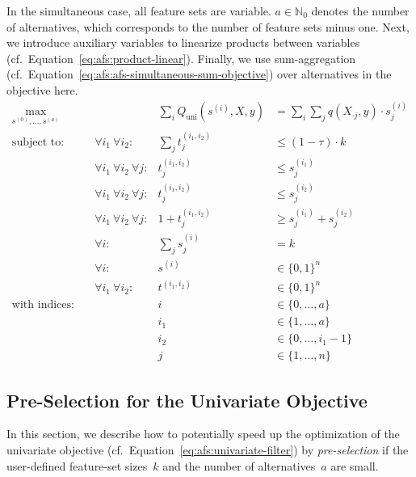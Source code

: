 \documentclass{article}
\theoremstyle{definition}
\begin{document}
In the simultaneous case, all feature sets are variable.
$a \in \mathbb{N}_0$ denotes the number of alternatives, which corresponds to the number of feature sets minus one.
Next, we introduce auxiliary variables to linearize products between variables (cf.~Equation~\ref{eq:afs:product-linear}).
Finally, we use sum-aggregation (cf.~Equation~\ref{eq:afs:afs-simultaneous-sum-objective}) over alternatives in the objective here.
%
\begin{equation}
	\begin{aligned}
		\max_{s^{(0)}, \dots, s^{(a)}} &\quad & \sum_i Q_{\text{uni}}(s^{(i)},X,y) &= \sum_i \sum_j q(X_{\cdot{}j},y) \cdot s^{(i)}_j\\
		\text{subject to:} &\quad \forall i_1~\forall i_2: & \sum_j t^{(i_1,i_2)}_j &\leq (1 - \tau) \cdot k \\
		&\quad \forall i_1~\forall i_2~\forall j: & t^{(i_1,i_2)}_j &\leq s^{(i_1)}_j \\
		&\quad \forall i_1~\forall i_2~\forall j: & t^{(i_1,i_2)}_j &\leq s^{(i_2)}_j \\
		&\quad \forall i_1~\forall i_2~\forall j: & 1 + t^{(i_1,i_2)}_j &\geq s^{(i_1)}_j + s^{(i_2)}_j \\
		&\quad \forall i: & \sum_j s^{(i)}_j &= k \\
		&\quad \forall i: & s^{(i)} &\in \{0,1\}^n \\
		&\quad \forall i_1~\forall i_2: & t^{(i_1,i_2)} &\in \{0,1\}^n \\
		\text{with indices:} &\quad & i &\in \{0, \dots, a\} \\
		&\quad & i_1 &\in \{1, \dots, a\} \\
		&\quad & i_2 &\in \{0, \dots, i_1-1\} \\
		&\quad & j &\in \{1, \dots, n\}
	\end{aligned}
	\label{eq:afs:afs-simultaneous-complete}
\end{equation}

\subsection{Pre-Selection for the Univariate Objective}
\label{sec:afs:appendix:univariate-pre-selection}

In this section, we describe how to potentially speed up the optimization of the univariate objective (cf.~Equation~\ref{eq:afs:univariate-filter}) by \emph{pre-selection} if the user-defined feature-set sizes~$k$ and the number of alternatives~$a$ are small.
\end{document}
